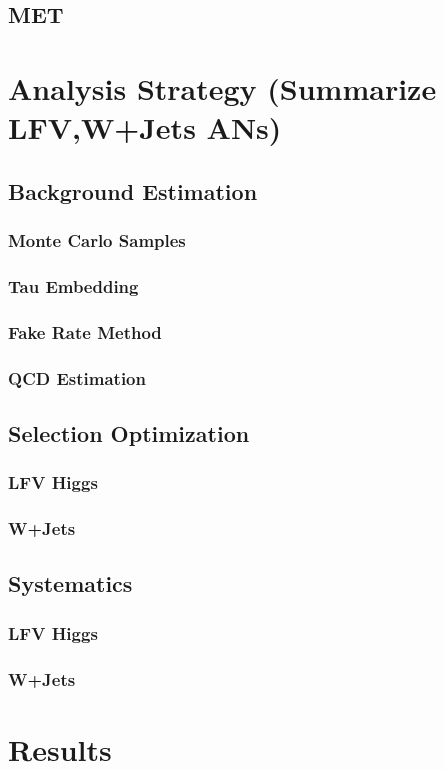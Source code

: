 \documentclass{article}
\begin{document}
\subsection{MET}

\section{Analysis Strategy (Summarize LFV,W+Jets ANs)}
\subsection{Background Estimation}
\subsubsection{Monte Carlo Samples}
\subsubsection{Tau Embedding}
\subsubsection{Fake Rate Method}
\subsubsection{QCD Estimation}
\subsection{Selection Optimization}
\subsubsection{LFV Higgs}
\subsubsection{W+Jets}
\subsection{Systematics}
\subsubsection{LFV Higgs}
\subsubsection{W+Jets}

\section{Results}
\end{document}
